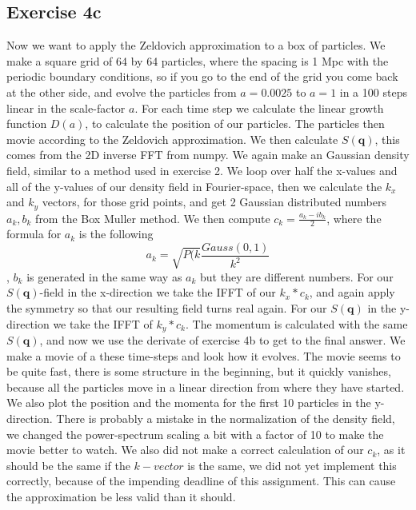 \subsection{Exercise 4c}
Now we want to apply the Zeldovich approximation to a box of particles. We make a square grid of 64 by 64 particles, where the spacing is 1 Mpc with the periodic boundary conditions, so if you go to the end of the grid you come back at the other side, and evolve the particles from $a=0.0025$ to $a=1$ in a 100 steps linear in the scale-factor $a$. For each time step we calculate the linear growth function $D(a)$, to calculate the position of our particles. The particles then movie according to the Zeldovich approximation. We then calculate $S(\textbf{q})$, this comes from the 2D inverse FFT from numpy. We again make an Gaussian density field, similar to a method used in exercise 2. We loop over half the x-values and all of the y-values of our density field in Fourier-space, then we calculate the $k_x$ and $k_y$ vectors, for those grid points, and get 2 Gaussian distributed numbers $a_k,b_k$ from the Box Muller method. We then compute $c_k=\frac{a_k-ib_k}{2}$, where the formula for $a_k$ is the following
\begin{equation}
    a_k=\sqrt{P(k}\frac{Gauss(0,1)}{k^2}
\end{equation}
, $b_k$ is generated in the same way as $a_k$ but they are different numbers. For our $S(\textbf{q})$-field in the x-direction we take the IFFT of our $k_x*c_k$, and again apply the symmetry so that our resulting field turns real again. For our $S(\textbf{q})$ in the y-direction we take the IFFT of $k_y*c_k$. The momentum is calculated with the same $S(\textbf{q})$, and now we use the derivate of exercise 4b to get to the final answer.
We make a movie of a these time-steps and look how it evolves. The movie seems to be quite fast, there is some structure in the beginning, but it quickly vanishes, because all the particles move in a linear direction from where they have started. We also plot the position and the momenta for the first 10 particles in the y-direction. There is probably a mistake in the normalization of the density field, we changed the power-spectrum scaling a bit with a factor of 10 to make the movie better to watch. We also did not make a correct calculation of our $c_k$, as it should be the same if the $k-vector$ is the same, we did not yet implement this correctly, because of the impending deadline of this assignment. This can cause the approximation be less valid than it should.

